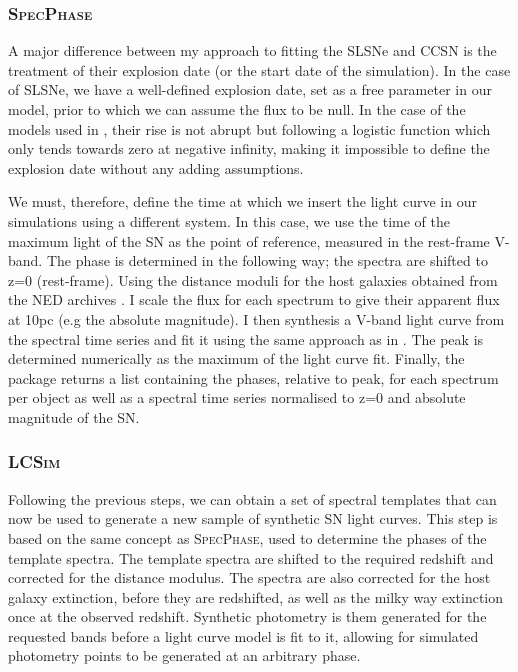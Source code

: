 \subsubsection{\textsc{SpecPhase}}
A major difference between my approach to fitting the SLSNe and CCSN is the treatment of their explosion date (or the start date of the simulation). In the case of SLSNe, we have a well-defined explosion date, set as a free parameter in our model, prior to which we can assume the flux to be null. In the case of the models used in , their rise is not abrupt but following a logistic function which only tends towards zero at negative infinity, making it impossible to define the explosion date without any adding assumptions.

We must, therefore, define the time at which we insert the light curve in our simulations using a different system. In this case, we use the time of the maximum light of the SN as the point of reference, measured in the rest-frame V-band. The phase is determined in the following way; the spectra are shifted to z=0 (rest-frame). Using the distance moduli for the host galaxies obtained from the NED archives \citep{Tully1988}. I scale the flux for each spectrum to give their apparent flux at 10pc (e.g the absolute magnitude). I then synthesis a V-band light curve from the spectral time series and fit it using the same approach as in . The peak is determined numerically as the maximum of the light curve fit. Finally, the package returns a list containing the phases, relative to peak, for each spectrum per object as well as a spectral time series normalised to z=0 and absolute magnitude of the SN.

\subsubsection{\textsc{LCSim}}
Following the previous steps, we can obtain a set of spectral templates that can now be used to generate a new sample of synthetic SN light curves. This step is based on the same concept as \textsc{SpecPhase}, used to determine the phases of the template spectra. The template spectra are shifted to the required redshift and corrected for the distance modulus. The spectra are also corrected for the host galaxy extinction, before they are redshifted, as well as the milky way extinction once at the observed redshift. Synthetic photometry is them generated for the requested bands before a light curve model is fit to it, allowing for simulated photometry points to be generated at an arbitrary phase.

